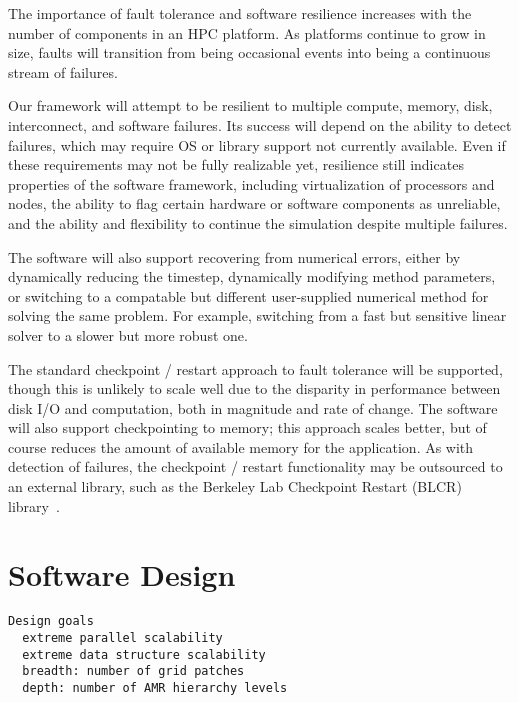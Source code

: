 \documentclass{article}
\begin{document}
The importance of fault tolerance and software resilience increases
with the number of components in an HPC platform.  As platforms
continue to grow in size, faults will transition from being occasional
events into being a continuous stream of failures.

Our framework will attempt to be resilient to multiple compute,
memory, disk, interconnect, and software failures.  Its success will
depend on the ability to detect failures, which may require OS or
library support not currently available.  Even if these requirements
may not be fully realizable yet, resilience still indicates properties
of the software framework, including virtualization of processors and
nodes, the ability to flag certain hardware or software components as
unreliable, and the ability and flexibility to continue the simulation
despite multiple failures.

The software will also support recovering from numerical errors,
either by dynamically reducing the timestep, dynamically modifying
method parameters, or switching to a compatable but different
user-supplied numerical method for solving the same problem.  For
example, switching from a fast but sensitive linear solver to a slower
but more robust one.

The standard checkpoint / restart approach to fault tolerance will be
supported, though this is unlikely to scale well due to the disparity
in performance between disk I/O and computation, both in magnitude and
rate of change.  The software will also support checkpointing to
memory; this approach scales better, but of course reduces the amount
of available memory for the application.  As with detection of
failures, the checkpoint / restart functionality may be outsourced to
an external library, such as the Berkeley Lab Checkpoint Restart
(BLCR) library~\cite{wwwblcr}.


\section{Software Design} \label{s:design}

\begin{verbatim}
Design goals
  extreme parallel scalability
  extreme data structure scalability
  breadth: number of grid patches
  depth: number of AMR hierarchy levels
\end{verbatim}
\end{document}
